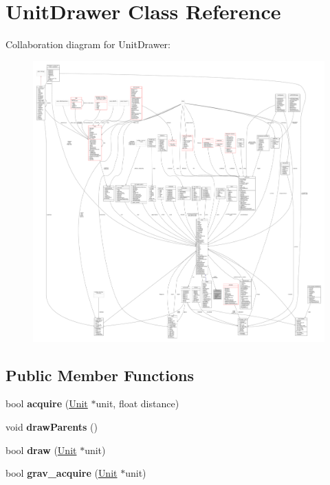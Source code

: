 \hypertarget{classUnitDrawer}{}\section{Unit\+Drawer Class Reference}
\label{classUnitDrawer}


Collaboration diagram for Unit\+Drawer\+:
\nopagebreak
\begin{figure}[H]
\begin{center}
\leavevmode
\includegraphics[width=350pt]{d4/d9e/classUnitDrawer__coll__graph}
\end{center}
\end{figure}
\subsection*{Public Member Functions}
\begin{DoxyCompactItemize}
\item 
bool {\bfseries acquire} (\hyperlink{classUnit}{Unit} $\ast$unit, float distance)\hypertarget{classUnitDrawer_a47db0510df829c8c67f35e843550aba9}{}\label{classUnitDrawer_a47db0510df829c8c67f35e843550aba9}

\item 
void {\bfseries draw\+Parents} ()\hypertarget{classUnitDrawer_ab2749b5cc62ee3701238b65967b979d2}{}\label{classUnitDrawer_ab2749b5cc62ee3701238b65967b979d2}

\item 
bool {\bfseries draw} (\hyperlink{classUnit}{Unit} $\ast$unit)\hypertarget{classUnitDrawer_ac5020bbd64278a2238e9422501f3b9c3}{}\label{classUnitDrawer_ac5020bbd64278a2238e9422501f3b9c3}

\item 
bool {\bfseries grav\+\_\+acquire} (\hyperlink{classUnit}{Unit} $\ast$unit)\hypertarget{classUnitDrawer_abfa2d98f95a4cd00f0b4250696ad5870}{}\label{classUnitDrawer_abfa2d98f95a4cd00f0b4250696ad5870}

\end{DoxyCompactItemize}
